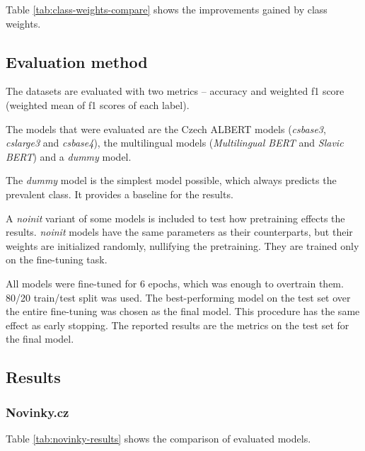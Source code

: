 \documentclass[
  printed, %
  color,   %
  table,   %
  oneside, %
  lof,     %
  lot,     %
]{fithesis3}
\begin{document}
Table \ref{tab:class-weights-compare} shows the improvements gained by class weights.


\subsection{Evaluation method}
\label{sec:class-eval-method}
The datasets are evaluated with two metrics -- accuracy and weighted f1 score (weighted mean of f1 scores of each label).

The models that were evaluated are the Czech ALBERT models (\textit{csbase3}, \textit{cslarge3} and \textit{csbase4}), the multilingual models (\textit{Multilingual BERT} and \textit{Slavic BERT}) and a \textit{dummy} model. 

The \textit{dummy} model is the simplest model possible, which always predicts the prevalent class. It provides a baseline for the results.

A \textit{noinit} variant of some models is included to test how pretraining effects the results. \textit{noinit} models have the same parameters as their counterparts, but their weights are initialized randomly, nullifying the pretraining. They are trained only on the fine-tuning task.

All models were fine-tuned for 6 epochs, which was enough to overtrain them. 80/20 train/test split was used. The best-performing model on the test set over the entire fine-tuning was chosen as the final model. This procedure has the same effect as early stopping. The reported results are the metrics on the test set for the final model. 

\subsection{Results}
\subsubsection{Novinky.cz}

Table \ref{tab:novinky-results} shows the comparison of evaluated models.
\end{document}

